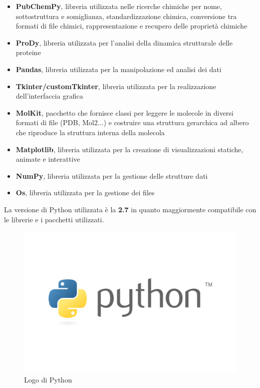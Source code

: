 \begin{itemize}
    \item \textbf{PubChemPy}, libreria utilizzata nelle ricerche chimiche per nome, sottostruttura e somiglianza, standardizzazione chimica, conversione tra formati di file chimici, rappresentazione e recupero delle proprietà chimiche
    \item \textbf{ProDy}, libreria utilizzata per l'analisi della dinamica strutturale delle proteine
    \item \textbf{Pandas}, libreria utilizzata per la manipolazione ed analisi dei dati
    \item \textbf{Tkinter/customTkinter}, libreria utilizzata per la realizzazione dell'interfaccia grafica
    \item \textbf{MolKit}, pacchetto che fornisce classi per leggere le molecole in diversi formati di file (PDB, Mol2...) e costruire una struttura gerarchica ad albero che riproduce la struttura interna della molecola
    \item \textbf{Matplotlib}, libreria utilizzata per la creazione di visualizzazioni statiche, animate e interattive
    \item \textbf{NumPy}, libreria utilizzata per la gestione delle strutture dati
    \item \textbf{Os}, libreria utilizzata per la gestione dei files
\end{itemize} 

La versione di Python utilizzata è la \textbf{2.7} in quanto maggiormente compatibile con le librerie e i pacchetti utilizzati.

\begin{figure}[H]
    \centering
    \includegraphics[scale=0.1]{immagini/capitolo2/pythonLogo.png}
    \caption{Logo di Python}
    \label{fig:python logo}
\end{figure}

